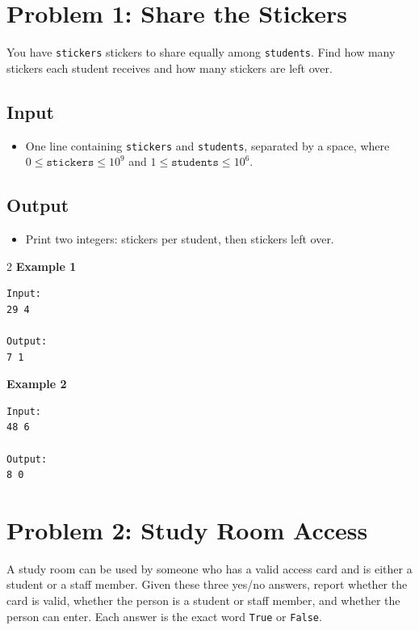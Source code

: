 \documentclass[12pt,oneside,openany]{article}
\begin{document}
\newpage
\section*{Problem 1: Share the Stickers}

You have \texttt{stickers} stickers to share equally among \texttt{students}. Find how many stickers each student receives and how many stickers are left over.

\subsection*{Input}
\begin{itemize}
    \item One line containing \texttt{stickers} and \texttt{students}, separated by a space, where $0 \leq \texttt{stickers} \leq 10^9$ and $1 \leq \texttt{students} \leq 10^6$.
\end{itemize}

\subsection*{Output}
\begin{itemize}
    \item Print two integers: stickers per student, then stickers left over.
\end{itemize}
\vspace{0.2cm}

\begin{example*}{}{}
\begin{multicols}{2}
\textbf{Example 1}
\begin{verbatim}
Input:
29 4

Output:
7 1
\end{verbatim}
\textbf{Example 2}
\begin{verbatim}
Input:
48 6

Output:
8 0
\end{verbatim}
\end{multicols}
\end{example*}
\newpage
\section*{Problem 2: Study Room Access}

A study room can be used by someone who has a valid access card and is either a student or a staff member. Given these three yes/no answers, report whether the card is valid, whether the person is a student or staff member, and whether the person can enter. Each answer is the exact word \texttt{True} or \texttt{False}.
\end{document}
